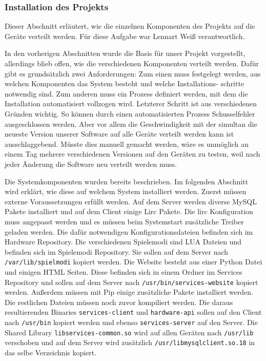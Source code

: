 \subsubsection{Installation des Projekts}

Dieser Abschnitt erläutert, wie die einzelnen Komponenten des Projekts auf die
Geräte verteilt werden. Für diese Aufgabe war Lennart Weiß verantwortlich.

In den vorherigen Abschnitten wurde die Basis für unser Projekt vorgestellt,
allerdings blieb offen, wie die verschiedenen Komponenten verteilt werden.
Dafür gibt es grundsätzlich zwei Anforderungen: Zum einen muss festgelegt
werden, aus welchen Komponenten das System besteht und welche Installations-
schritte notwendig sind. Zum anderen muss ein Prozess definiert werden, mit dem
die Installation automatisiert vollzogen wird. Letzterer Schritt ist aus
verschiedenen Gründen wichtig. So können durch einen automatisierten
Prozess Schusselfehler ausgeschlossen werden. Aber vor allem die Geschwindigkeit
mit der simultan die neueste Version unserer Software auf alle Geräte verteilt
werden kann ist ausschlaggebend. Müsste dies manuell gemacht werden, wäre es
unmöglich an einem Tag mehrere verschiedenen Versionen auf den Geräten zu
testen, weil nach jeder Änderung die Software neu verteilt werden muss.

Die Systemkomponenten wurden bereits beschrieben. Im folgenden Abschnitt wird
erklärt, wie diese auf welchem System installiert werden. Zuerst müssen externe
Voraussetzungen erfüllt werden. Auf dem Server werden diverse MySQL Pakete
installiert und auf dem Client einige Lirc Pakete. Die lirc Konfiguration muss
angepasst werden und es müssen beim Systemstart zusätzliche Treiber geladen
werden. Die dafür notwendigen Konfigurationsdateien befinden sich im Hardware
Repository. Die verschiedenen Spielemodi sind LUA Dateien und befinden sich
im Spielemodi Repository. Sie sollen auf dem Server nach 
\texttt{/var/lib/spielmodi} kopiert werden. Die Website besteht aus einer
Python Datei und einigen HTML Seiten. Diese befinden sich in einem Ordner im
Services Repository und sollen auf dem Server nach 
\texttt{/usr/bin/services-website} kopiert werden. Außerdem müssen mit Pip
einige zusätzliche Pakete installiert werden. Die restlichen Dateien
müssen noch zuvor kompiliert werden. Die daraus resultierenden Binaries 
\texttt{services-client} und \texttt{hardware-api} sollen auf den Client nach
\texttt{/usr/bin} kopiert werden und ebenso \texttt{services-server} auf
den Server. Die Shared Library \texttt{libservices-common.so} wird auf allen
Geräten nach \texttt{/usr/lib} verschoben und auf dem Server wird zusätzlich
\texttt{/usr/libmysqlclient.so.18} in das selbe Verzeichnis kopiert.

